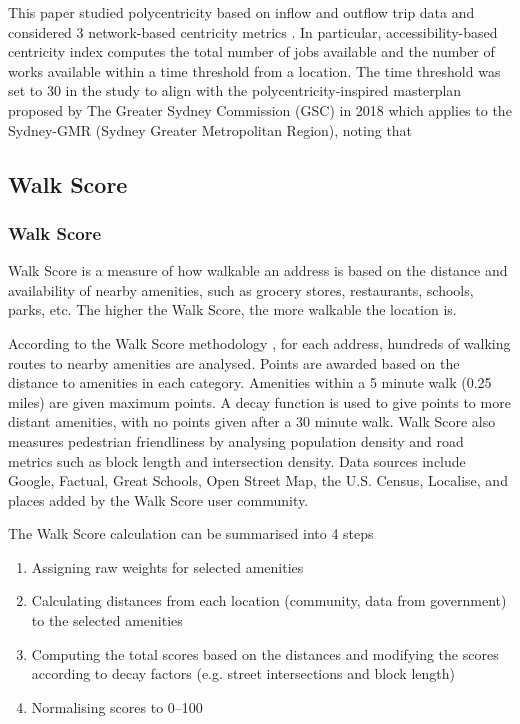 This paper studied polycentricity based on inflow and outflow trip data and considered 3 network-based centricity metrics \cite{sarkar_measuring_2020}. In particular, accessibility-based centricity index computes the total number of jobs available and the number of works available within a time threshold from a location. The time threshold was set to 30 in the study to align with the polycentricity-inspired masterplan proposed by The Greater Sydney Commission (GSC) in 2018 which applies to the Sydney-GMR (Sydney Greater Metropolitan Region), noting that 

\subsection{Walk Score}

\subsubsection{Walk Score}

Walk Score is a measure of how walkable an address is based on the distance and availability of nearby amenities, such as grocery stores, restaurants, schools, parks, etc. The higher the Walk Score, the more walkable the location is.

According to the Walk Score methodology \cite{walkscore}, for each address, hundreds of walking routes to nearby amenities are analysed. Points are awarded based on the distance to amenities in each category. Amenities within a 5 minute walk (0.25 miles) are given maximum points. A decay function is used to give points to more distant amenities, with no points given after a 30 minute walk. Walk Score also measures pedestrian friendliness by analysing population density and road metrics such as block length and intersection density. Data sources include Google, Factual, Great Schools, Open Street Map, the U.S. Census, Localise, and places added by the Walk Score user community.

The Walk Score calculation can be summarised into 4 steps

\begin{enumerate}
    \item Assigning raw weights for selected amenities
    \item Calculating distances from each location (community, data from government) to the selected amenities
    \item Computing the total scores based on the distances and modifying the scores according to decay factors (e.g. street intersections and block length)
    \item Normalising scores to 0–100
\end{enumerate}

